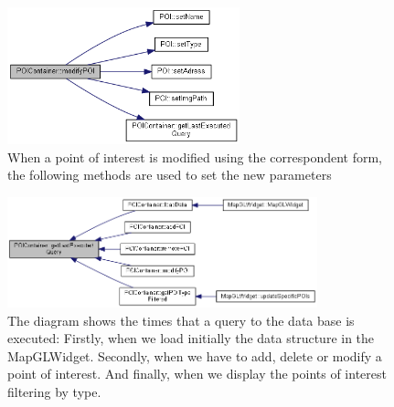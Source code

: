 \documentclass{article}
\begin{document}
\begin{figure}[h]
\centering
\includegraphics[width=0.6\textwidth]{8.png}
\caption{When a point of interest is modified using the correspondent form, the following methods are used to set the new parameters}
\end{figure}

\begin{figure}[h]
\centering
\includegraphics[width=0.8\textwidth]{9.png}
\caption{The diagram shows the times that a query to the data base is executed: Firstly, when we load initially the data structure in the MapGLWidget. Secondly, when we have to add, delete or modify a point of interest. And finally, when we display the points of interest filtering by type.}
\end{figure}
\end{document}
